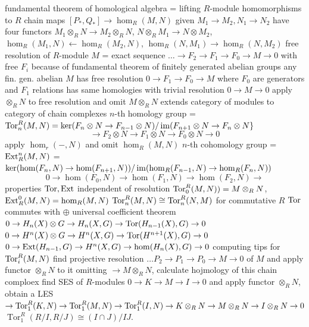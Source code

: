 \begin{outline}
    \1 fundamental theorem of homological algebra = lifting $R$-module homomorphisms to $R$ chain maps
    \1 $[P_*,Q_*]\rightarrow \hom_R(M,N)$
    \1 given $M_1\rightarrow M_2, N_1\rightarrow N_2$ have four functors 
        \2 $M_1\otimes_R N \rightarrow M_2 \otimes_R N$, 
        \2 $N\otimes_R M_1 \rightarrow N \otimes M_2$, 
        \2 $\hom_R(M_1,N)\leftarrow \hom_R(M_2,N)$, 
        \2 $\hom_R(N,M_1)\rightarrow \hom_R(N,M_2)$
    \1 free resolution of $R$-module $M$ = exact sequence $\ldots\rightarrow F_2 \rightarrow F_1 \rightarrow F_0 \rightarrow M \rightarrow 0$ with free $F_i$ 
        \2 because of fundamental theorem of finitely generated abelian groups any fin. gen. abelian $M$ has free resolution $0\rightarrow F_1 \rightarrow F_0 \rightarrow M$ where $F_0$ are generators and $F_1$ relations
        \2 has same homologies with trivial resolution $0\rightarrow M \rightarrow 0$
    \1 apply $\otimes_R N$ to free resolution and omit $M\otimes_R N$
        \2 extends category of modules to category of chain complexes
        \2 $n$-th homology group = $\operatorname{Tor}^R_n(M,N)=\ker(F_n\otimes N \rightarrow F_{n-1}\otimes N) / \operatorname{im} (F_{n+1}\otimes N \rightarrow F_{n}\otimes N\}$ 
        $$\rightarrow F_2 \otimes N \rightarrow F_1 \otimes N \rightarrow F_0 \otimes N \rightarrow 0$$
    \1 apply $\hom_r(-,N)$ and omit $\hom_R(M,N)$ 
        \2 $n$-th cohomology group = $\operatorname{Ext}^n_R(M,N)$ = $\ker(\hom(F_n,N)\rightarrow \hom(F_{n+1}, N))/\operatorname{im}(\hom_R(F_{n-1},N)\rightarrow\hom_R(F_n, N))$
        $$0\rightarrow \hom(F_0,N)\rightarrow \hom(F_1,N)\rightarrow \hom(F_2,N)\rightarrow$$
    \1 properties
        \2 $\operatorname{Tor}, \operatorname{Ext}$ independent of resolution
        \2 $\operatorname{Tor}^R_0 (M,N) ) = M \otimes_R N$, $\operatorname{Ext}^0_R(M,N) = \hom_R(M,N)$
        \2 $\operatorname{Tor}^R_n(M,N) \cong \operatorname{Tor}^R_n(N,M)$ for commutative $R$
        \2 $\operatorname{Tor}$ commutes with $\oplus$
    \1 universal coefficient theorem
        \2 $0\rightarrow H_n(X)\otimes G \rightarrow H_n(X,G)\rightarrow \operatorname{Tor}(H_{n-1}(X),G)\rightarrow 0$
        \2 $0 \rightarrow H^n (X)\otimes G \rightarrow H^n(X,G) \rightarrow \operatorname{Tor} (H^{n+1}(X),G)\rightarrow 0$
        \2 $0\rightarrow \operatorname{Ext}(H_{n-1},G)\rightarrow H^n(X,G)\rightarrow\hom(H_n(X),G)\rightarrow 0$
    \1 computing tips for $\operatorname{Tor}^R_i(M,N)$
        \2 find projective resolution $\ldots P_2 \rightarrow P_1 \rightarrow P_0 \rightarrow M \rightarrow 0$ of $M$ and apply functor $\otimes_R N$ to it omitting $\rightarrow M\otimes_R N$, calculate hojmology of this chain comploex
        \2 find SES of $R$-modules $0\rightarrow K\rightarrow M\rightarrow I\rightarrow 0$ and apply functor $\otimes_R N$, obtain a LES $\rightarrow \operatorname{Tor}^R_1(K,N)\rightarrow \operatorname{Tor}^R_1(M,N)\rightarrow \operatorname{Tor}^R_1(I,N)\rightarrow K\otimes_R N \rightarrow M \otimes_R N \rightarrow I\otimes_R N \rightarrow 0$
        \2  ${\operatorname{Tor}_1^R(R/I, R/J) \cong (I \cap J) / IJ}$.
\end{outline}

